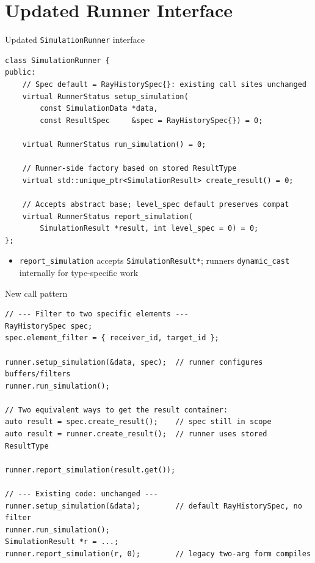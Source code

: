 \documentclass{beamer}
\begin{document}
\section{Updated Runner Interface}

\begin{frame}[fragile]{Updated \texttt{SimulationRunner} interface}
\begin{lstlisting}
class SimulationRunner {
public:
    // Spec default = RayHistorySpec{}: existing call sites unchanged
    virtual RunnerStatus setup_simulation(
        const SimulationData *data,
        const ResultSpec     &spec = RayHistorySpec{}) = 0;

    virtual RunnerStatus run_simulation() = 0;

    // Runner-side factory based on stored ResultType
    virtual std::unique_ptr<SimulationResult> create_result() = 0;

    // Accepts abstract base; level_spec default preserves compat
    virtual RunnerStatus report_simulation(
        SimulationResult *result, int level_spec = 0) = 0;
};
\end{lstlisting}
\begin{itemize}
  \item \lstinline|report_simulation| accepts \lstinline|SimulationResult*|;
        runners \lstinline|dynamic_cast| internally for type-specific work
\end{itemize}
\end{frame}

\begin{frame}[fragile]{New call pattern}
\begin{lstlisting}
// --- Filter to two specific elements ---
RayHistorySpec spec;
spec.element_filter = { receiver_id, target_id };

runner.setup_simulation(&data, spec);  // runner configures buffers/filters
runner.run_simulation();

// Two equivalent ways to get the result container:
auto result = spec.create_result();    // spec still in scope
auto result = runner.create_result();  // runner uses stored ResultType

runner.report_simulation(result.get());

// --- Existing code: unchanged ---
runner.setup_simulation(&data);        // default RayHistorySpec, no filter
runner.run_simulation();
SimulationResult *r = ...;
runner.report_simulation(r, 0);        // legacy two-arg form compiles
\end{lstlisting}
\end{frame}
\end{document}
